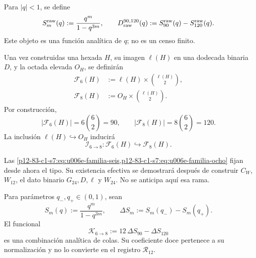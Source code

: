 {\begin{definition}
\label{p12-83-c1-s7:def:u006e-diferencia-cruda}
Para \(|q|<1\), se define
\begin{equation}
 S_m^{\rm raw}(q):=\frac{q^m}{1-q^{3m}},
 \qquad
 D_{\rm raw}^{90,120}(q)
 :=S_{90}^{\rm raw}(q)-S_{120}^{\rm raw}(q).
 \label{p12-83-c1-s7:eq:u006e-series-crudas}
\end{equation}
Este objeto es una función analítica de \(q\); no es un censo finito.
\end{definition}

\begin{definition}
\label{p12-83-c1-s7:def:u006e-familias-incidencia}
Una vez construidas una hexada \(H\), su imagen
\(\ell(H)\) en una dodecada binaria \(D\), y la octada elevada
\(O_H\), se definirán
\begin{align}
 \mathcal F_6(H)
 &:=\ell(H)\times\binom{\ell(H)}2,
 \label{p12-83-c1-s7:eq:u006e-familia-seis}\\
 \mathcal F_8(H)
 &:=O_H\times\binom{\ell(H)}2.
 \label{p12-83-c1-s7:eq:u006e-familia-ocho}
\end{align}
Por construcción,
\begin{equation}
 |\mathcal F_6(H)|
 =6\binom62=90,
 \qquad
 |\mathcal F_8(H)|
 =8\binom62=120.
 \label{p12-83-c1-s7:eq:u006e-cardinales-incidencia}
\end{equation}
La inclusión \(\ell(H)\hookrightarrow O_H\) inducirá
\begin{equation}
 \mathcal I_{6\to8}:
 \mathcal F_6(H)\hookrightarrow\mathcal F_8(H).
 \label{p12-83-c1-s7:eq:u006e-inclusion-incidencia}
\end{equation}
\end{definition}

Las \cref{p12-83-c1-s7:eq:u006e-familia-seis,p12-83-c1-s7:eq:u006e-familia-ocho} fijan desde ahora el
tipo. Su existencia efectiva se demostrará después de construir
\(C_W\), \(W_{12}\), el dato binario \(G_{24},D,\ell\) y \(W_{24}\).
No se anticipa aquí esa rama.

\begin{definition}
\label{p12-83-c1-s7:def:u006e-combinacion-colas}
Para parámetros \(q_-,q_+\in(0,1)\), sean
\begin{equation}
 S_m(q):=\frac{q^m}{1-q^{3m}},
 \qquad
 \Delta S_m:=S_m(q_-)-S_m(q_+).
 \label{p12-83-c1-s7:eq:u006e-colas-normalizadas}
\end{equation}
El funcional
\begin{equation}
 \mathcal K_{6\to8}
 :=12\,\Delta S_{90}-\Delta S_{120}
 \label{p12-83-c1-s7:eq:u006e-funcional-seis-ocho}
\end{equation}
es una combinación analítica de colas. Su coeficiente doce pertenece a su
normalización y no lo convierte en el registro
\(\mathcal R_{12}\).
\end{definition}

}
